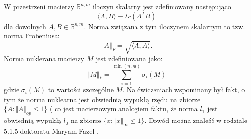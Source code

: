 \documentclass[10pt,a4paper,draft]{report}
\begin{document}
\newcommand{\rset}{\mathbb{R}}
\newcommand{\rsetd}{\mathbb{R}^d}
\newcommand{\step}{\gamma}

\newcommand{\norm}[1]{\left\Vert #1 \right\Vert}
\newcommand{\normNuc}[1]{\left\Vert #1 \right\Vert_{*}}
\def\prox{\operatorname{prox}}
\def\argmin{\operatorname{argmin}}
\def\argminl{\operatornamewithlimits{argmin}}
\def\diag{\operatorname{diag}}

\newtheorem{theorem}{Twierdzenie}


\newtheorem{lemma}[lemma]{Lemma}

\newtheorem{corollary}[corollary]{Wniosek}

\newtheorem{proposition}[proposition]{Proposition}

\newtheorem{definition}[definition]{Definicja}

\newtheorem{remark}[remark]{Remark}


\newtheorem{example}[theorem]{Example}

\newtheorem{problem}{Zadanie}

\newenvironment{proof}{\textbf{Dowód}}

\noindent W przestrzeni macierzy $\rset^{n,m}$ iloczyn skalarny jest zdefiniowany następująco:
\[
\langle A, B \rangle = tr(A^T B)
\]
dla dowolnych $A,B \in \rset^{n,m}$. Norma związana z tym iloczynem skalarnym to tzw. norma Frobeniusa:
\[
\norm{A}_F = \sqrt{\langle A , A \rangle}.
\]
Norma nuklerana macierzy $M$ jest zdefiniowana jako:
\[
\normNuc{M} = \sum_{i=1}^{\min(n,m)} \sigma_i(M)
\]
gdzie $\sigma_i(M)$ to wartości szczególne $M$. Na ćwiczeniach wspominany był fakt, o tym że norma nuklearna jest obwiednią wypukłą rzędu na zbiorze \\ $\{ A : \norm{A}_{op} \leq 1 \}$ ( co jest macierzowym analogiem faktu, że norma $l_1$ jest obwiednią wypukłą $l_0$ na zbiorze $\{x : \norm{x}_{\infty} \leq 1 \}$. Dowód można znaleźć w rodziale 5.1.5 doktoratu Maryam Fazel \cite{MFPhD}.
\end{document}
